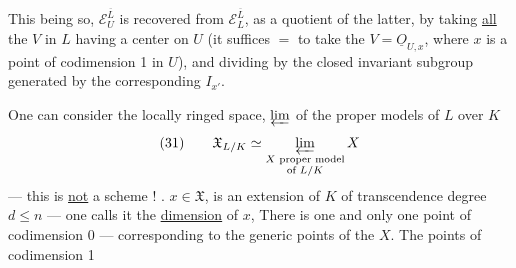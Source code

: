 This being so, $\mathcal E_U^{\overline L}$ is recovered from $\mathcal E_L^{\overline L}$, as a quotient of the latter, by taking \uline{all} the $V$ in $L$ having a center on $U$ (it suffices $=$ to take the $V=\underline{O}_{U,x}$, where $x$ is a point of codimension 1 in $U$), and dividing by the closed invariant subgroup generated by the corresponding $I_{x'}$.

One can consider the locally ringed space, $\varprojlim$ of the  proper models of $L$ over $K$
\[
(31)\qquad\mathfrak X_{L/K}\simeq\varprojlim_{\substack{X\text{ proper model}\\\text{of }L/K}}X
\]
--- this is \uline{not} a scheme ! .  
$x\in\mathfrak X$,   is an extension of $K$ of transcendence degree $d\leq n$ --- one calls it the \uline{dimension} of $x$,  There is one and only one point of codimension 0 --- corresponding to the generic points of the $X$. The points of codimension 1
